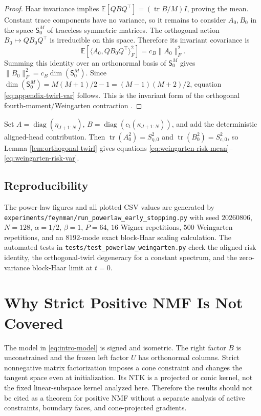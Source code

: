 \documentclass{article}
\newcommand{\E}{\mathbb E}
\newcommand{\tr}{\operatorname{tr}}
\newcommand{\diag}{\operatorname{diag}}
\begin{document}
\begin{proof}
Haar invariance implies \(\E[QBQ^\top]=(\tr B/M)I\), proving the mean.  Constant trace components have no variance, so it remains to consider \(A_0,B_0\) in the space \(\mathsf S_0^M\) of traceless symmetric matrices.  The orthogonal action \(B_0\mapsto QB_0Q^\top\) is irreducible on this space.  Therefore its invariant covariance is
\begin{equation}
\E\!\left[\langle A_0,QB_0Q^\top\rangle_F^2\right]
=c_B\|A_0\|_F^2.
\end{equation}
Summing this identity over an orthonormal basis of \(\mathsf S_0^M\) gives
\(\|B_0\|_F^2=c_B\dim(\mathsf S_0^M)\).  Since
\(\dim(\mathsf S_0^M)=M(M+1)/2-1=(M-1)(M+2)/2\), equation \eqref{eq:appendix-twirl-var} follows.  This is the invariant form of the orthogonal fourth-moment/Weingarten contraction \citep{CollinsSniady2006}.
\end{proof}

Set \(A=\diag(\eta_{J+1:N})\),
\(B=\diag(c_t(\kappa_{J+1:N}))\), and add the deterministic aligned-head contribution.  Then
\(\tr(A_0^2)=S_{\eta,0}^2\) and
\(\tr(B_0^2)=S_{c,0}^2\), so Lemma \ref{lem:orthogonal-twirl} gives equations \eqref{eq:weingarten-risk-mean}--\eqref{eq:weingarten-risk-var}.

\subsection{Reproducibility}
The power-law figures and all plotted CSV values are generated by
\texttt{experiments/feynman/run\_powerlaw\_early\_stopping.py} with seed \(20260806\), \(N=128\), \(\alpha=1/2\), \(\beta=1\), \(P=64\), \(16\) Wigner repetitions, \(500\) Weingarten repetitions, and an \(8192\)-mode exact block-Haar scaling calculation.  The automated tests in \texttt{tests/test\_powerlaw\_weingarten.py} check the aligned risk identity, the orthogonal-twirl degeneracy for a constant spectrum, and the zero-variance block-Haar limit at \(t=0\).

\section{Why Strict Positive NMF Is Not Covered}
The model in \eqref{eq:intro-model} is signed and isometric. The right factor \(B\) is unconstrained and the frozen left factor \(U\) has orthonormal columns. Strict nonnegative matrix factorization imposes a cone constraint and changes the tangent space even at initialization. Its NTK is a projected or conic kernel, not the fixed linear-subspace kernel analyzed here. Therefore the results should not be cited as a theorem for positive NMF without a separate analysis of active constraints, boundary faces, and cone-projected gradients.
\end{document}
